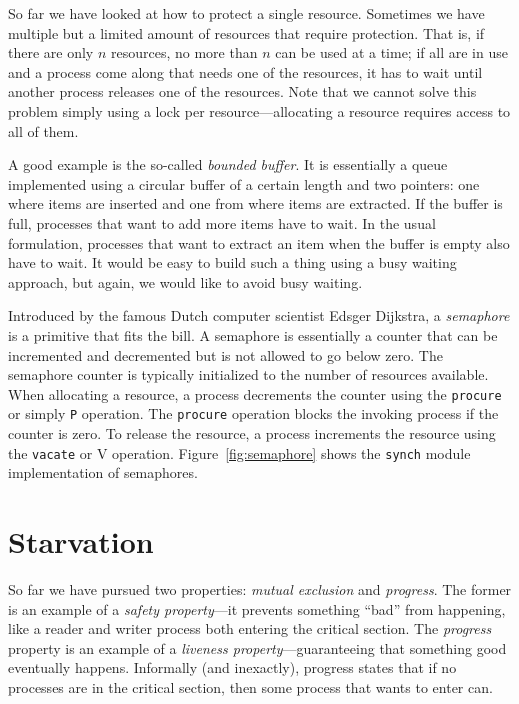 \documentclass{report}
\begin{document}
So far we have looked at how to protect a single resource.  Sometimes
we have multiple but a limited amount of resources that require
protection.  That is, if there are only $n$ resources, no more than
$n$ can be used at a time; if all are in use and a process come along
that needs one of the resources, it has to wait until another process
releases one of the resources.  Note that we cannot solve this problem
simply using a lock per resource---allocating a resource requires access
to all of them.

A good example is the so-called \emph{bounded buffer}.  It is essentially
a queue implemented using a circular buffer of a certain length and two pointers:
one where items are inserted and one from where items are extracted.  If the
buffer is full, processes that want to add more items have to wait.  In the usual
formulation, processes that want to extract an item when the buffer is empty
also have to wait.  It would be easy to build such a thing using a busy waiting
approach, but again, we would like to avoid busy waiting.

Introduced by the famous Dutch computer scientist Edsger Dijkstra,
a \emph{semaphore} is a primitive that fits the bill.  A semaphore is essentially
a counter that can be incremented and decremented but is not allowed to go
below zero.  The semaphore counter is typically initialized to the number of
resources available.  When allocating a resource, a process decrements the
counter using the \texttt{procure} or simply \texttt{P} operation.  The
\texttt{procure} operation blocks the invoking process if the counter is zero.
To release the resource, a process increments the resource using the
\texttt{vacate} or {V} operation.
Figure~\ref{fig:semaphore} shows the \texttt{synch} module implementation of
semaphores.

\chapter{Starvation}

So far we have pursued two properties: \emph{mutual exclusion}
and \emph{progress}.  The former is an example of a
\emph{safety property}---it prevents something ``bad'' from
happening, like a reader and writer process both entering the
critical section.  The \emph{progress} property is an example
of a \emph{liveness property}---guaranteeing that something good
eventually happens.
Informally (and inexactly), progress states that if no processes
are in the critical section, then some process that wants to enter
can.
\end{document}
